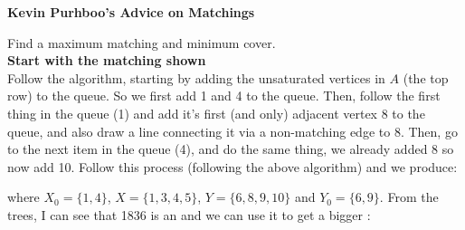\documentclass[english, 11pt]{article}
\begin{document}
\textbf{Kevin Purhboo's Advice on Matchings} \\

\begin{center}
  \end{center}

  Find a maximum matching and minimum cover. \\

  \textbf{Start with the matching shown} \\

  Follow the algorithm, starting by adding the unsaturated vertices in $A$ (the top row) to the queue. So we first add 1 and 4 to the queue. Then, follow the first thing in the queue (1) and add it's first (and only) adjacent vertex 8 to the queue, and also draw a line connecting it via a non-matching edge to 8. Then, go to the next item in the queue (4), and do the same thing, we already added 8 so now add 10. Follow this process (following the above algorithm) and we produce:

  \begin{center}
  \end{center}
  where $X_0 = \{1,4\}$, $X = \{1,3,4,5\}$, $Y = \{6,8,9,10\}$ and $Y_0 = \{6,9\}$. From the trees, I can see that 1836 is an  and we can use it to get a bigger :
\end{document}
